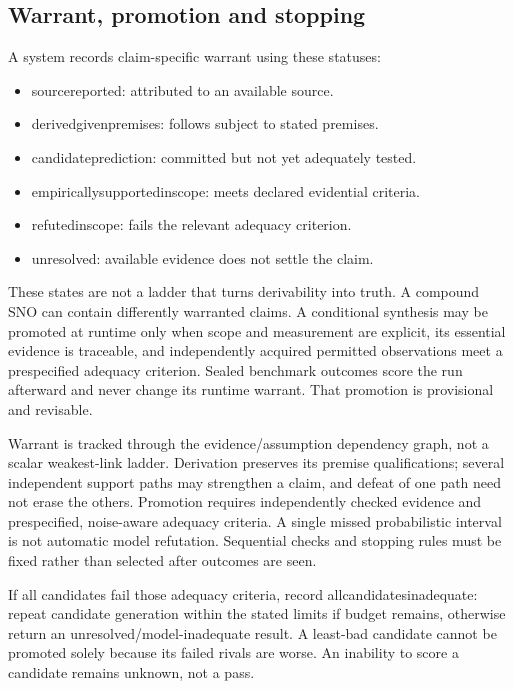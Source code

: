 \documentclass[11pt,a4paper]{article}
\newcommand{\CNSIdentifier}[1]{{\small\ttfamily\def\_{\textunderscore\allowbreak}#1}}
\providecommand{\tightlist}{\setlength{\itemsep}{0pt}\setlength{\parskip}{0pt}}
\begin{document}
\subsection{Warrant, promotion and
stopping}\label{warrant-promotion-and-stopping}

A system records claim-specific warrant using these statuses:

\begin{itemize}
\tightlist
\item
  \CNSIdentifier{source\_reported}: attributed to an available source.
\item
  \CNSIdentifier{derived\_given\_premises}: follows subject to stated premises.
\item
  \CNSIdentifier{candidate\_prediction}: committed but not yet adequately
  tested.
\item
  \CNSIdentifier{empirically\_supported\_in\_scope}: meets declared evidential
  criteria.
\item
  \CNSIdentifier{refuted\_in\_scope}: fails the relevant adequacy criterion.
\item
  \CNSIdentifier{unresolved}: available evidence does not settle the claim.
\end{itemize}

These states are not a ladder that turns derivability into truth. A
compound SNO can contain differently warranted claims. A conditional
synthesis may be promoted at runtime only when scope and measurement are
explicit, its essential evidence is traceable, and independently
acquired permitted observations meet a prespecified adequacy criterion.
Sealed benchmark outcomes score the run afterward and never change its
runtime warrant. That promotion is provisional and revisable.

Warrant is tracked through the evidence/assumption dependency graph, not
a scalar weakest-link ladder. Derivation preserves its premise
qualifications; several independent support paths may strengthen a
claim, and defeat of one path need not erase the others. Promotion
requires independently checked evidence and prespecified, noise-aware
adequacy criteria. A single missed probabilistic interval is not
automatic model refutation. Sequential checks and stopping rules must be
fixed rather than selected after outcomes are seen.

If all candidates fail those adequacy criteria, record
\CNSIdentifier{all\_candidates\_inadequate}: repeat candidate generation within
the stated limits if budget remains, otherwise return an
unresolved/model-inadequate result. A least-bad candidate cannot be
promoted solely because its failed rivals are worse. An inability to
score a candidate remains unknown, not a pass.
\end{document}
